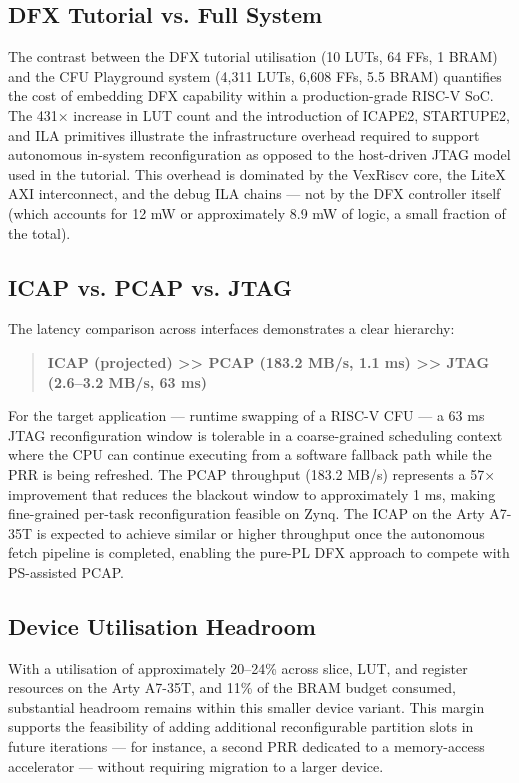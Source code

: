 \subsection{DFX Tutorial vs. Full System}

The contrast between the DFX tutorial utilisation (10 LUTs, 64 FFs, 1 BRAM) and the CFU Playground system (4,311 LUTs, 6,608 FFs, 5.5 BRAM) quantifies the cost of embedding DFX capability within a production-grade RISC-V SoC. The 431× increase in LUT count and the introduction of ICAPE2, STARTUPE2, and ILA primitives illustrate the infrastructure overhead required to support autonomous in-system reconfiguration as opposed to the host-driven JTAG model used in the tutorial. This overhead is dominated by the VexRiscv core, the LiteX AXI interconnect, and the debug ILA chains — not by the DFX controller itself (which accounts for 12 mW or approximately 8.9 mW of logic, a small fraction of the total).

\subsection{ICAP vs. PCAP vs. JTAG}

The latency comparison across interfaces demonstrates a clear hierarchy:

\begin{quote}
\textbf{ICAP (projected) \textgreater{}\textgreater{} PCAP (183.2 MB/s, 1.1 ms) \textgreater{}\textgreater{} JTAG (2.6–3.2 MB/s, 63 ms)}
\end{quote}

For the target application — runtime swapping of a RISC-V CFU — a 63 ms JTAG reconfiguration window is tolerable in a coarse-grained scheduling context where the CPU can continue executing from a software fallback path while the PRR is being refreshed. The PCAP throughput (183.2 MB/s) represents a 57× improvement that reduces the blackout window to approximately 1 ms, making fine-grained per-task reconfiguration feasible on Zynq. The ICAP on the Arty A7-35T is expected to achieve similar or higher throughput once the autonomous fetch pipeline is completed, enabling the pure-PL DFX approach to compete with PS-assisted PCAP.

\subsection{Device Utilisation Headroom}

With a utilisation of approximately 20–24\% across slice, LUT, and register resources on the Arty A7-35T, and 11\% of the BRAM budget consumed, substantial headroom remains within this smaller device variant. This margin supports the feasibility of adding additional reconfigurable partition slots in future iterations — for instance, a second PRR dedicated to a memory-access accelerator — without requiring migration to a larger device.

